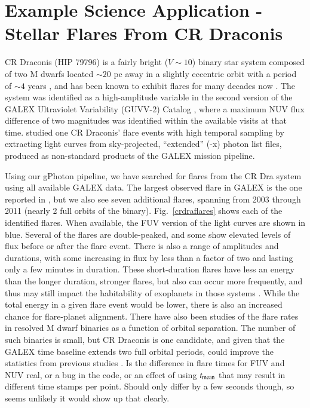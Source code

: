 \documentclass[5p]{elsarticle}
\begin{document}
\section{Example Science Application - Stellar Flares From CR Draconis}
\label{scienceexamples}
CR Draconis (HIP 79796) is a fairly bright ($V \sim 10$) binary star system composed of two M dwarfs located $\sim 20$ pc away in a slightly eccentric orbit with a period of $\sim 4$ years \citep{tam2008}, and has been known to exhibit flares for many decades now \citep{cri1970}.  The system was identified as a high-amplitude variable in the second version of the GALEX Ultraviolet Variability (GUVV-2) Catalog \citep{whe2008}, where a maximum NUV flux difference of two magnitudes was identified within the available visits at that time.  \citet{wel2006} studied one CR Draconis' flare events with high temporal sampling by extracting light curves from sky-projected, ``extended'' (-x) photon list files, produced as non-standard products of the GALEX mission pipeline.

Using our gPhoton pipeline, we have searched for flares from the CR Dra system using all available GALEX data.  The largest observed flare in GALEX is the one reported in \citet{wel2006}, but we also see seven additional flares, spanning from 2003 through 2011 (nearly 2 full orbits of the binary).  Fig.\ \ref{crdraflares} shows each of the identified flares.  When available, the FUV version of the light curves are shown in blue.  Several of the flares are double-peaked, and some show elevated levels of flux before or after the flare event.  There is also a range of amplitudes and durations, with some increasing in flux by less than a factor of two and lasting only a few minutes in duration.  These short-duration flares have less an energy than the longer duration, stronger flares, but also can occur more frequently, and thus may still impact the habitability of exoplanets in those systems \citep[e.g.,][]{ram2013}.  While the total energy in a given flare event would be lower, there is also an increased chance for flare-planet alignment.  There have also been studies of the flare rates in resolved M dwarf binaries as a function of orbital separation.  The number of such binaries is small, but CR Draconis is one candidate, and given that the GALEX time baseline extends two full orbital periods, could improve the statistics from previous studies \citep{tam2008}.  {\color{red}Is the difference in flare times for FUV and NUV real, or a bug in the code, or an effect of using $t_{\rm{mean}}$ that may result in different time stamps per point.  Should only differ by a few seconds though, so seems unlikely it would show up that clearly.}
\end{document}
